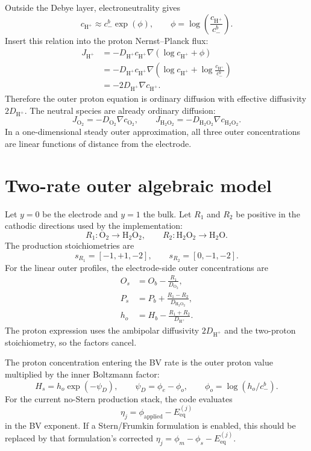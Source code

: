 \documentclass[11pt]{article}
\newcommand{\OO}{\mathrm{O}_2}
\newcommand{\PP}{\mathrm{H}_2\mathrm{O}_2}
\newcommand{\HH}{\mathrm{H}^{+}}
\newcommand{\Eeq}{E_{\mathrm{eq}}}
\begin{document}
Outside the Debye layer, electroneutrality gives
\begin{equation}
  c_{\HH} \approx c_-^b\exp(\phi),
  \qquad
  \phi = \log\!\left(\frac{c_{\HH}}{c_-^b}\right).
  \label{eq:outer-electroneutral}
\end{equation}
Insert this relation into the proton Nernst--Planck flux:
\begin{align}
  J_{\HH}
  &=
  -D_{\HH}c_{\HH}\nabla(\log c_{\HH}+\phi) \\
  &=
  -D_{\HH}c_{\HH}
  \nabla\!\left(\log c_{\HH}+\log\!\frac{c_{\HH}}{c_-^b}\right) \\
  &=
  -2D_{\HH}\nabla c_{\HH}.
  \label{eq:ambipolar-h}
\end{align}
Therefore the outer proton equation is ordinary diffusion with effective
diffusivity \(2D_{\HH}\). The neutral species are already ordinary diffusion:
\[
  J_{\OO}=-D_{\OO}\nabla c_{\OO},
  \qquad
  J_{\PP}=-D_{\PP}\nabla c_{\PP}.
\]
In a one-dimensional steady outer approximation, all three outer
concentrations are linear functions of distance from the electrode.

\section{Two-rate outer algebraic model}

Let \(y=0\) be the electrode and \(y=1\) the bulk. Let \(R_1\) and \(R_2\) be
positive in the cathodic directions used by the implementation:
\[
  R_1:\OO\rightarrow\PP,
  \qquad
  R_2:\PP\rightarrow\mathrm{H}_2\mathrm{O}.
\]
The production stoichiometries are
\[
  s_{R_1}=[-1,+1,-2],
  \qquad
  s_{R_2}=[0,-1,-2].
\]
For the linear outer profiles, the electrode-side outer concentrations are
\begin{align}
  O_s &= O_b - \frac{R_1}{D_{\OO}}, \\
  P_s &= P_b + \frac{R_1-R_2}{D_{\PP}}, \\
  h_o &= H_b - \frac{R_1+R_2}{D_{\HH}}.
  \label{eq:outer-surface}
\end{align}
The proton expression uses the ambipolar diffusivity \(2D_{\HH}\) and the
two-proton stoichiometry, so the factors cancel.

The proton concentration entering the BV rate is the outer proton value
multiplied by the inner Boltzmann factor:
\begin{equation}
  H_s = h_o\exp(-\psi_D),
  \qquad
  \psi_D = \phi_e-\phi_o,
  \qquad
  \phi_o = \log(h_o/c_-^b).
  \label{eq:h-surface}
\end{equation}
For the current no-Stern production stack, the code evaluates
\[
  \eta_j = \phi_{\mathrm{applied}}-\Eeq^{(j)}
\]
in the BV exponent. If a Stern/Frumkin formulation is enabled, this should be
replaced by that formulation's corrected \(\eta_j=\phi_m-\phi_s-\Eeq^{(j)}\).
\end{document}
